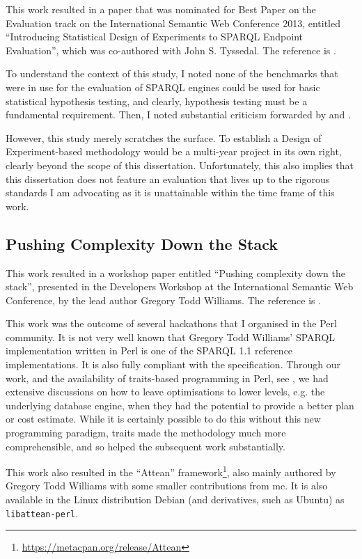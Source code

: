 This work resulted in a paper that was nominated for Best Paper on the
Evaluation track on the International Semantic Web Conference 2013,
entitled ``Introducing Statistical Design of Experiments to SPARQL
Endpoint Evaluation'', which was co-authored with John
S. Tyssedal. The reference is \cite{kjernsmo_doe_intro}.

To understand the context of this study, I noted none of the
benchmarks that were in use for the evaluation of SPARQL engines could
be used for basic statistical hypothesis testing, and clearly,
hypothesis testing must be a fundamental requirement. Then, I noted
substantial criticism forwarded by
\cite{Duan:2011:AOC:1989323.1989340} and \cite{MontoyaVCRA12}.

However, this study merely scratches the surface. To establish a
Design of Experiment-based methodology would be a multi-year project
in its own right, clearly beyond the scope of this
dissertation. Unfortunately, this also implies that this dissertation
does not feature an evaluation that lives up to the rigorous standards
I am advocating as it is unattainable within the time frame of this
work.

\subsection{Pushing Complexity Down the Stack}\label{sec:conpush}

This work resulted in a workshop paper entitled ``Pushing complexity
down the stack'', presented in the Developers Workshop at the
International Semantic Web Conference, by the lead author Gregory Todd
Williams. The reference is \cite{williamspushing}.


This work was the outcome of several hackathons that I organised
in the Perl community. It is not very well known that Gregory Todd
Williams' SPARQL implementation written in Perl is one of the SPARQL
1.1 reference implementations. It is also fully compliant with
the specification. Through our work, and the availability of
traits-based programming in Perl, see \cite{traits}, we had extensive
discussions on how to leave optimisations to lower levels, e.g. the
underlying database engine, when they had the potential to provide a
better plan or cost estimate. While it is certainly possible to do
this without this new programming paradigm, traits made the
methodology much more comprehensible, and so helped the subsequent
work substantially.

This work also resulted in the ``Attean''
framework\footnote{\url{https://metacpan.org/release/Attean}}, also
mainly authored by Gregory Todd Williams with some smaller
contributions from me. It is also available in the Linux distribution
Debian (and derivatives, such as Ubuntu) as \texttt{libattean-perl}.

